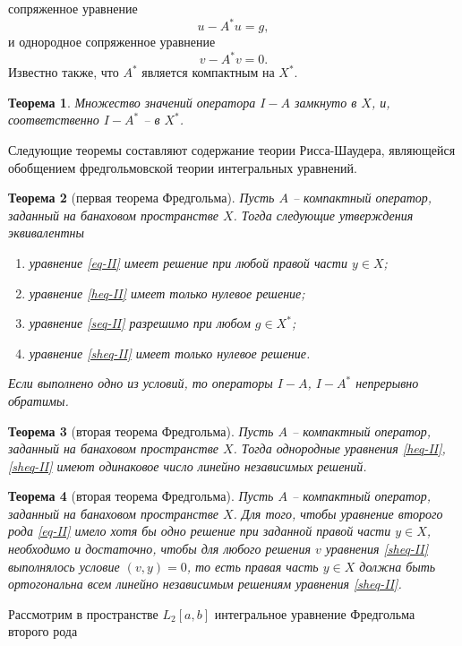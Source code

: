 \documentclass[a4paper, 12pt]{report}
\numberwithin{equation}{section}
\newtheorem*{theorem}{Теорема}
\begin{document}
	сопряженное уравнение 
	\begin{equation}
		\label{seq-II}
		u - A^*u = g,
	\end{equation}
	и однородное сопряженное уравнение 
	\begin{equation}
		\label{sheq-II}
		v - A^* v = 0.
	\end{equation}
	Известно также, что $A^*$ является компактным на $X^*$.
	\begin{theorem}
		Множество значений оператора $I - A$ замкнуто в $X$, и, соответственно $I-A^*$ -- в $X^*$.
	\end{theorem}
	\noindent
	Следующие теоремы составляют содержание теории Рисса-Шаудера, являющейся обобщением фредгольмовской теории интегральных уравнений.
	\begin{theorem}[первая теорема Фредгольма]
		Пусть $A$ -- компактный оператор, заданный на банаховом пространстве $X$. Тогда следующие утверждения эквивалентны
		\begin{enumerate}
			\item уравнение \eqref{eq-II} имеет решение при любой правой части $y \in X$;
			\item уравнение \eqref{heq-II} имеет только нулевое решение;
			\item уравнение \eqref{seq-II} разрешимо при любом $g \in X^*$;
			\item уравнение \eqref{sheq-II} имеет только нулевое решение.
		\end{enumerate}
		Если выполнено одно из условий, то операторы $I-A$, $I-A^*$ непрерывно обратимы.
	\end{theorem}
	\begin{theorem}[вторая теорема Фредгольма]
		Пусть $A$ -- компактный оператор, заданный на банаховом пространстве $X$. Тогда однородные уравнения \eqref{heq-II}, \eqref{sheq-II} имеют одинаковое число линейно независимых решений.
	\end{theorem}
	\begin{theorem}[вторая теорема Фредгольма]
		Пусть $A$ -- компактный оператор, заданный на банаховом пространстве $X$. Для того, чтобы уравнение второго рода \eqref{eq-II} имело хотя бы одно решение при заданной правой части $y \in X$, необходимо и достаточно, чтобы для любого решения $v$ уравнения \eqref{sheq-II} выполнялось условие $(v,y) = 0$, то есть правая часть $y \in X$ должна быть ортогональна всем линейно независимым решениям уравнения \eqref{sheq-II}.
	\end{theorem}
	Рассмотрим в пространстве $L_2[a,b]$ интегральное уравнение Фредгольма второго рода
\end{document}
